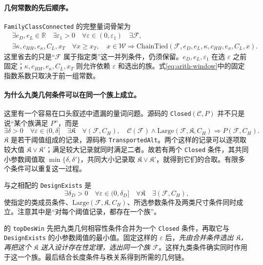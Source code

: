 \paragraph{几何常数的先后顺序。}
\texttt{FamilyClassConnected} 的完整量词骨架为
\begin{equation}
\begin{split}
&\exists e_D,e_L\in\mathbb R\quad\exists\varepsilon_1>0\quad
\forall\varepsilon\in(0,\varepsilon_1)\quad\exists\mathcal F,\\
&\exists\kappa,c_{HH},e_\kappa,C_L,x_T\quad
\forall x\ge x_T,\quad
x\in\mathcal W\Longrightarrow
\mathrm{ChainTied}(\mathcal F,e_D,e_L,\kappa,c_{HH},e_\kappa,C_L,x).
\end{split}
\label{eq:arith-tied-quantifiers}
\end{equation}
这里省去的只是“$\mathcal F$ 属于指定类”这一并列条件，仍须保留。$e_D,e_L,\varepsilon_1$ 在选 $\varepsilon$ 之前固定；$\kappa,c_{HH},e_\kappa,C_L,x_T$ 则允许依赖 $\varepsilon$ 和选出的族。式\eqref{eq:arith-window}中的固定指数系数只取决于前一组常数。


\paragraph{为什么九类几何条件可以在同一个族上成立。}
这里有一个容易在口头叙述中遗漏的量词问题。源码的 \texttt{Closed}$(\mathcal C,P)$ 并不只是说“某个族满足 $P$”，而是
\[
\exists\delta>0\quad\forall\varepsilon\in(0,\delta]
\quad\exists\mathfrak K\quad
\forall(\mathcal F,C_H),\quad
\mathcal C(\mathcal F)\land\mathrm{Large}(\mathcal F,\mathfrak K,C_H)
\Longrightarrow P(\mathcal F,C_H).
\]
$\mathfrak K$ 是若干阈值组成的记录，源码称 \texttt{TransportedAlt}。两个这样的记录可以逐项取较大值 $\mathfrak K\vee\mathfrak K'$；满足较大记录就同时满足二者。故若有两个 \texttt{Closed} 条件，其共同小参数阈值取 $\min\{\delta,\delta'\}$，共同大小记录取 $\mathfrak K\vee\mathfrak K'$，就得到它们的合取。有限多个条件可以重复这一过程。

与之相配的 \texttt{DesignExists} 是
\[
\exists\delta_D>0\quad\forall\varepsilon\in(0,\delta_D]
\quad\forall\mathfrak K\quad\exists(\mathcal F,C_H),
\]
使指定的类成员条件、$\mathrm{Large}(\mathcal F,\mathfrak K,C_H)$、所选参数条件及两类尺寸条件同时成立。注意其中是“对每个阈值记录，都存在一个族”。

 的 \texttt{topDesWin} 先把九类几何相容性条件合并为一个 \texttt{Closed} 条件，再取它与 \texttt{DesignExists} 的小参数阈值的最小值。固定这样的 $\varepsilon$ 后，\emph{先由合并条件选出 $\mathfrak K$，再把这个 $\mathfrak K$ 送入设计存在性定理，选出同一个族 $\mathcal F$}。这样九类条件确实同时作用于这一个族。最后结合长度条件与秩关系得到所需的几何链。

